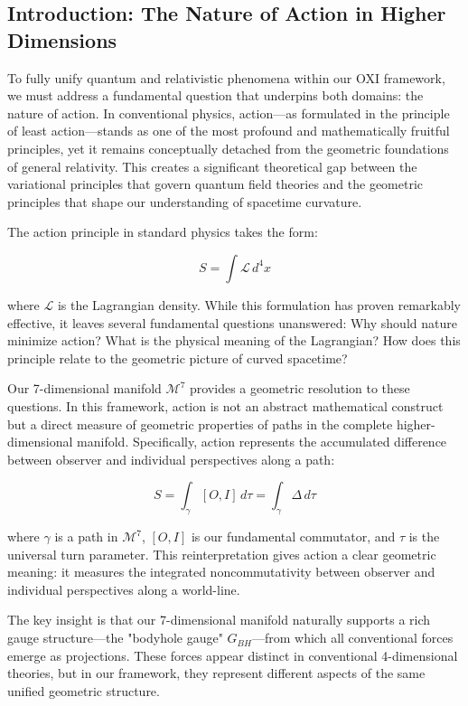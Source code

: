 \documentclass{article}
\begin{document}
\subsection{Introduction: The Nature of Action in Higher Dimensions}

To fully unify quantum and relativistic phenomena within our OXI framework, we must address a fundamental question that underpins both domains: the nature of action. In conventional physics, action—as formulated in the principle of least action—stands as one of the most profound and mathematically fruitful principles, yet it remains conceptually detached from the geometric foundations of general relativity. This creates a significant theoretical gap between the variational principles that govern quantum field theories and the geometric principles that shape our understanding of spacetime curvature.

The action principle in standard physics takes the form:

\begin{equation}
S = \int \mathcal{L} \, d^4x
\end{equation}

where $\mathcal{L}$ is the Lagrangian density. While this formulation has proven remarkably effective, it leaves several fundamental questions unanswered: Why should nature minimize action? What is the physical meaning of the Lagrangian? How does this principle relate to the geometric picture of curved spacetime?

Our 7-dimensional manifold $\mathcal{M}^7$ provides a geometric resolution to these questions. In this framework, action is not an abstract mathematical construct but a direct measure of geometric properties of paths in the complete higher-dimensional manifold. Specifically, action represents the accumulated difference between observer and individual perspectives along a path:

\begin{equation}
S = \int_{\gamma} [O, I] \, d\tau = \int_{\gamma} \Delta \, d\tau
\end{equation}

where $\gamma$ is a path in $\mathcal{M}^7$, $[O, I]$ is our fundamental commutator, and $\tau$ is the universal turn parameter. This reinterpretation gives action a clear geometric meaning: it measures the integrated noncommutativity between observer and individual perspectives along a world-line.

The key insight is that our 7-dimensional manifold naturally supports a rich gauge structure—the "bodyhole gauge" $G_{BH}$—from which all conventional forces emerge as projections. These forces appear distinct in conventional 4-dimensional theories, but in our framework, they represent different aspects of the same unified geometric structure.
\end{document}
